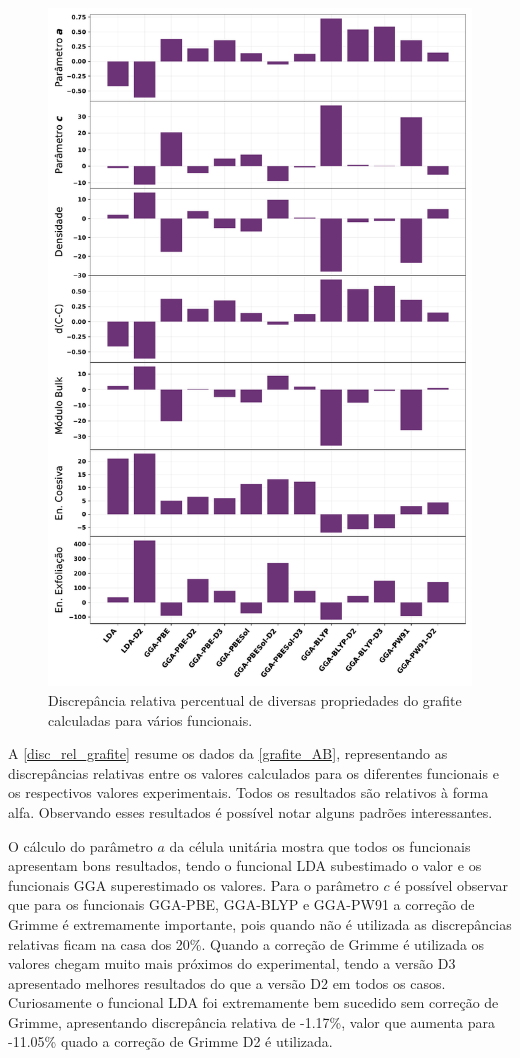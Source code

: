		\begin{figure}[!h]
			\centering
			\includegraphics[width=.85\linewidth]{capitulos/fig/results0/disc_rel_grafite}
			\caption{Discrepância relativa percentual de diversas propriedades do grafite calculadas para vários funcionais.}
			\label{disc_rel_grafite}
		\end{figure}
	
		A \autoref{disc_rel_grafite} resume os dados da \autoref{grafite_AB}, representando as discrepâncias relativas entre os valores calculados para os diferentes funcionais e os respectivos valores experimentais. Todos os resultados são relativos à forma alfa. Observando esses resultados é possível notar alguns padrões interessantes. 
		
		O cálculo do parâmetro $a$ da célula unitária mostra que todos os funcionais apresentam bons resultados, tendo o funcional LDA subestimado o valor e os funcionais GGA superestimado os valores. Para o parâmetro $c$ é possível observar que para os funcionais GGA-PBE, GGA-BLYP e GGA-PW91 a correção de Grimme é extremamente importante, pois quando não é utilizada as discrepâncias relativas ficam na casa dos 20\%. Quando a correção de Grimme é utilizada os valores chegam muito mais próximos do experimental, tendo a versão D3 apresentado melhores resultados do que a versão D2 em todos os casos. Curiosamente o funcional LDA foi extremamente bem sucedido sem correção de Grimme, apresentando discrepância relativa de -1.17\%, valor que aumenta para -11.05\% quado a correção de Grimme D2 é utilizada. 
		
